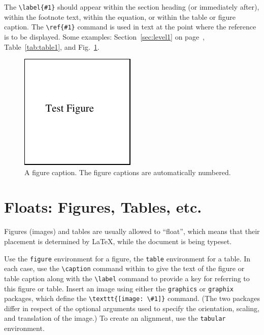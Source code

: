 \documentclass[]{article}
\begin{document}
The \verb+\label{#1}+ should appear within the section heading (or immediately after), within the footnote text, within the equation, or within the table or figure caption. The \verb+\ref{#1}+ command is used in text at the point where the reference is to be displayed.  Some examples: Section~\ref{sec:level1} on page~\pageref{sec:level1}, Table~\ref{tab:table1}, and Fig.~\ref{fig:epsart}.
\begin{figure}[b]
  \centering
  \includegraphics{figures/fig_1}%
  \caption{\label{fig:epsart} A figure caption. The figure captions are automatically numbered.}
\end{figure}

\section{Floats: Figures, Tables, etc.}
Figures (images) and tables are usually allowed to ``float'', which means that their placement is determined by \LaTeX, while the document is being typeset. 

Use the \texttt{figure} environment for a figure, the \texttt{table} environment for a table. In each case, use the \verb+\caption+ command within to give the text of the figure or table caption along with the \verb+\label+ command to provide a key for referring to this figure or table. Insert an image using either the \texttt{graphics} or \texttt{graphix} packages, which define the \verb+\texttt{[image: \#1]}+ command. (The two packages differ in respect of the optional arguments used to specify the orientation, scaling, and translation of the image.) To create an alignment, use the \texttt{tabular} environment. 
\end{document}
